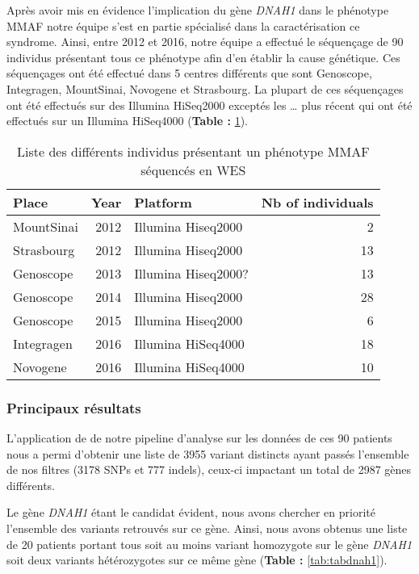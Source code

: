 \documentclass[12pt,twoside]{reedthesis}
\theoremstyle{definition}
\theoremstyle{definition}
\theoremstyle{remark}
\begin{document}
  Après avoir mis en évidence l'implication du gène \emph{DNAH1} dans le
  phénotype MMAF notre équipe s'est en partie spécialisé dans la
  caractérisation ce syndrome. Ainsi, entre 2012 et 2016, notre équipe a
  effectué le séquençage de 90 individus présentant tous ce phénotype afin
  d'en établir la cause génétique. Ces séquençages ont été effectué dans 5
  centres différents que sont Genoscope, Integragen, MountSinai, Novogene
  et Strasbourg. La plupart de ces séquençages ont été effectués sur des
  Illumina HiSeq2000 exceptés les \ldots{} plus récent qui ont été
  effectués sur un Illumina HiSeq4000 (\textbf{Table :
  }\ref{tab:tabrunbigmmaf}).
  
  \begin{longtable}[t]{lrlr}
  \caption{\label{tab:tabrunbigmmaf}Liste des différents individus présentant un phénotype MMAF séquencés en WES}\\
  \toprule
  Place & Year & Platform & Nb of individuals\\
  \midrule
  MountSinai & 2012 & Illumina Hiseq2000 & 2\\
  Strasbourg & 2012 & Illumina Hiseq2000 & 13\\
  Genoscope & 2013 & Illumina Hiseq2000? & 13\\
  Genoscope & 2014 & Illumina Hiseq2000 & 28\\
  Genoscope & 2015 & Illumina Hiseq2000 & 6\\
  \addlinespace
  Integragen & 2016 & Illumina HiSeq4000 & 18\\
  Novogene & 2016 & Illumina HiSeq4000 & 10\\
  \bottomrule
  \end{longtable}
  
  
  
  \newpage
  
  \subsubsection{Principaux résultats}\label{principaux-resultats-4}
  
  L'application de de notre pipeline d'analyse sur les données de ces 90
  patients nous a permi d'obtenir une liste de 3955 variant distincts
  ayant passés l'ensemble de nos filtres (3178 SNPs et 777 indels),
  ceux-ci impactant un total de 2987 gènes différents.
  
  Le gène \emph{DNAH1} étant le candidat évident, nous avons chercher en
  priorité l'ensemble des variants retrouvés sur ce gène. Ainsi, nous
  avons obtenus une liste de 20 patients portant tous soit au moins
  variant homozygote sur le gène \emph{DNAH1} soit deux variants
  hétérozygotes sur ce même gène (\textbf{Table : }\ref{tab:tabdnah1}).
  
\end{document}
